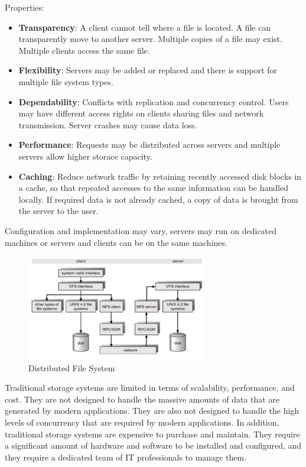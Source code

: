 Properties:
\begin{itemize}
    \item \textbf{Transparency}: A client cannot tell where a file is located. A file can transparently move to another server. Multiple copies of a file may exist. Multiple clients access the same file.
    \item \textbf{Flexibility}: Servers may be added or replaced and there is support for multiple file system types.
    \item \textbf{Dependability}: Conflicts with replication and concurrency control. Users may have different access rights on clients sharing files and network transmission. Server crashes may cause data loss.
    \item \textbf{Performance}: Requests may be distributed across servers and multiple servers allow higher storace capacity.
    \item \textbf{Caching}: Reduce network traffic by retaining recently accessed disk blocks in a cache, so that repeated accesses to the same information can be handled locally. If required data is not already cached, a copy of data is brought from the server to the user. 
\end{itemize}

Configuration and implementation may vary, servers may run on dedicated machines or servers and clients can be on the same machines. 

\begin{figure}[H]
    \centering
    \includegraphics[width=0.7\textwidth]{assets/fig42.png}
    \caption{Distributed File System}
\end{figure}

\begin{warningblock}
    Traditional storage systems are limited in terms of scalability, performance, and cost. They are not designed to handle the massive amounts of data that are generated by modern applications. They are also not designed to handle the high levels of concurrency that are required by modern applications. In addition, traditional storage systems are expensive to purchase and maintain. They require a significant amount of hardware and software to be installed and configured, and they require a dedicated team of IT professionals to manage them.
\end{warningblock}


